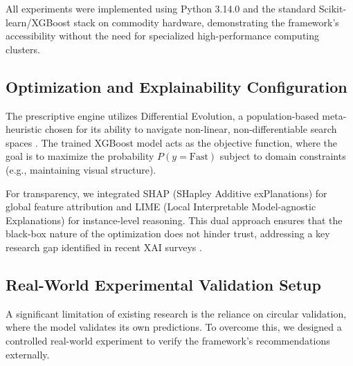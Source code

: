 \documentclass[sn-nature]{sn-jnl}
\begin{document}
All experiments were implemented using Python 3.14.0 and the standard Scikit-learn/XGBoost stack on commodity hardware, demonstrating the framework's accessibility without the need for specialized high-performance computing clusters.

\subsection{Optimization and Explainability Configuration}

The prescriptive engine utilizes Differential Evolution, a population-based meta-heuristic chosen for its ability to navigate non-linear, non-differentiable search spaces \cite{asha2025, surianarayanan2023}. The trained XGBoost model acts as the objective function, where the goal is to maximize the probability $P(y=\text{Fast})$ subject to domain constraints (e.g., maintaining visual structure).

For transparency, we integrated SHAP (SHapley Additive exPlanations) for global feature attribution and LIME (Local Interpretable Model-agnostic Explanations) for instance-level reasoning. This dual approach ensures that the black-box nature of the optimization does not hinder trust, addressing a key research gap identified in recent XAI surveys \cite{salih2024, hassija2024, alam2024}.

\subsection{Real-World Experimental Validation Setup}

A significant limitation of existing research is the reliance on circular validation, where the model validates its own predictions. To overcome this, we designed a controlled real-world experiment to verify the framework's recommendations externally.
\end{document}
